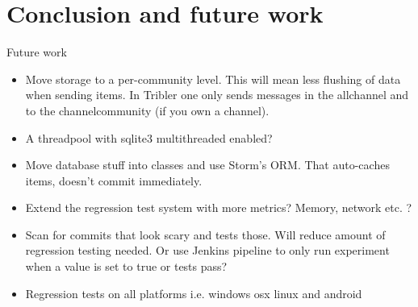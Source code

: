 \chapter{Conclusion and future work}
\label{cpt:conclusion_and_future_work}

Future work

\begin{itemize}
	\item Move storage to a per-community level. This will mean less flushing of data when sending items. In Tribler one only sends messages in the allchannel and to the channelcommunity (if you own a channel).
	\item A threadpool with sqlite3 multithreaded enabled? 
	\item Move database stuff into classes and use Storm's ORM. That auto-caches items, doesn't commit immediately.
	\item Extend the regression test system with more metrics? Memory, network etc. ?
	\item Scan for commits that look scary \cite{huang2014performance} and tests those. Will reduce amount of regression testing needed. Or use Jenkins pipeline to only run experiment when a value is set to true or tests pass?
	\item Regression tests on all platforms i.e. windows osx linux and android
\end{itemize}